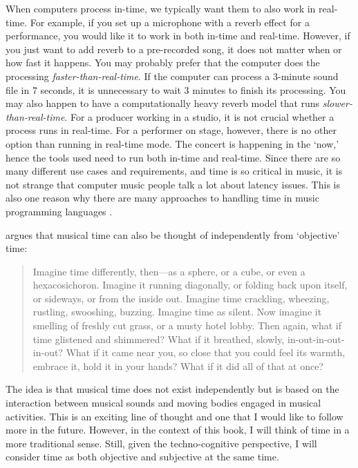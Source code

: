 When computers process in-time, we typically want them to also work in real-time. For example, if you set up a microphone with a reverb effect for a performance, you would like it to work in both in-time and real-time. However, if you just want to add reverb to a pre-recorded song, it does not matter when or how fast it happens. You may probably prefer that the computer does the processing \emph{faster-than-real-time}. If the computer can process a 3-minute sound file in 7 seconds, it is unnecessary to wait 3 minutes to finish its processing. You may also happen to have a computationally heavy reverb model that runs \emph{slower-than-real-time}. For a producer working in a studio, it is not crucial whether a process runs in real-time. For a performer on stage, however, there is no other option than running in real-time mode. The concert is happening in the `now,' hence the tools used need to run both in-time and real-time. Since there are so many different use cases and requirements, and time is so critical in music, it is not strange that computer music people talk a lot about latency issues. This is also one reason why there are many approaches to handling time in music programming languages \citep{dannenberg_languages_2018}.

\citet[p.3]{kozak_enacting_2019} argues that musical time can also be thought of independently from `objective' time:

\begin{quotation}
Imagine time differently, then---as a sphere, or a cube, or even a hexacosichoron. Imagine it running diagonally, or folding back upon itself, or sideways, or from the inside out. Imagine time crackling, wheezing, rustling, swooshing, buzzing. Imagine time as silent. Now imagine it smelling of freshly cut grass, or a musty hotel lobby. Then again, what if time glistened and shimmered? What if it breathed, slowly, in-out-in-out-in-out? What if it came near you, so close that you could feel its warmth, embrace it, hold it in your hands? What if it did all of that at once?
\end{quotation}

The idea is that musical time does not exist independently but is based on the interaction between musical sounds and moving bodies engaged in musical activities. This is an exciting line of thought and one that I would like to follow more in the future. However, in the context of this book, I will think of time in a more traditional sense. Still, given the techno-cognitive perspective, I will consider time as both objective and subjective at the same time.

